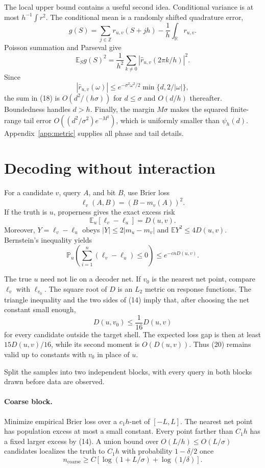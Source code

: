 \documentclass{article}
\theoremstyle{definition}
\theoremstyle{remark}
\newcommand{\E}{\mathbb E}
\newcommand{\Prb}{\mathbb P}
\newcommand{\R}{\mathbb R}
\newcommand{\1}{\mathbf 1}
\begin{document}
The local upper bound contains a useful second idea. Conditional variance is at most \(h^{-1}\int r^2\). The conditional mean is a randomly shifted quadrature error, \[ g(S)=\sum_{j\in\mathbb Z}r_{u,v}(S+jh)-\frac1h\int_\R r_{u,v}. \] Poisson summation and Parseval give \[ \E_Sg(S)^2= \frac1{h^2}\sum_{k\neq0} \left|\widehat r_{u,v}(2\pi k/h)\right|^2. \tag{18} \] Since \[ |\widehat r_{u,v}(\omega)| \leq e^{-\sigma^2\omega^2/2}\min\{d,2/|\omega|\}, \] the sum in (18) is \(O(d^2/(h\sigma))\) for \(d\leq\sigma\) and \(O(d/h)\) thereafter. Boundedness handles \(d>h\). Finally, the margin \(M\sigma\) makes the squared finite-range tail error \(O((d^2/\sigma^2)e^{-M^2})\), which is uniformly smaller than \(\psi_h(d)\). Appendix~\ref{app:metric} supplies all phase and tail details.

\section{Decoding without interaction}

For a candidate \(v\), query \(A\), and bit \(B\), use Brier loss \[ \ell_v(A,B)=(B-m_v(A))^2. \] If the truth is \(u\), properness gives the exact excess risk \[ \E_u[\ell_v-\ell_u]=D(u,v). \tag{19} \] Moreover, \(Y=\ell_v-\ell_u\) obeys \(|Y|\leq2|m_u-m_v|\) and \(\E Y^2\leq4D(u,v)\). Bernstein's inequality yields \[ \Prb_u\left(\sum_{i=1}^n(\ell_v-\ell_u)\leq0\right) \leq e^{-cnD(u,v)}. \tag{20} \]

The true \(u\) need not lie on a decoder net. If \(v_0\) is the nearest net point, compare \(\ell_v\) with \(\ell_{v_0}\). The square root of \(D\) is an \(L_2\) metric on response functions. The triangle inequality and the two sides of (14) imply that, after choosing the net constant small enough, \[ D(u,v_0)\leq \frac1{16}D(u,v) \tag{21} \] for every candidate outside the target shell. The expected loss gap is then at least \(15D(u,v)/16\), while its second moment is \(O(D(u,v))\). Thus (20) remains valid up to constants with \(v_0\) in place of \(u\).

Split the samples into two independent blocks, with every query in both blocks drawn before data are observed.

\paragraph{Coarse block.} Minimize empirical Brier loss over a \(c_1h\)-net of \([-L,L]\). The nearest net point has population excess at most a small constant. Every point farther than \(C_1h\) has a fixed larger excess by (14). A union bound over \(O(L/h)\leq O(L/\sigma)\) candidates localizes the truth to \(C_1h\) with probability \(1-\delta/2\) once
\[ n_{\mathrm{coarse}}\geq C[\log(1+L/\sigma)+\log(1/\delta)]. \tag{22} \]
\end{document}
